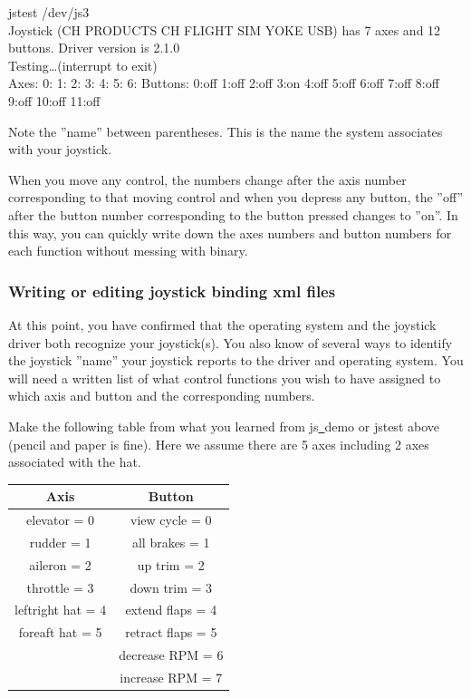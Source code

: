\begin{ttfamily}
\tiny
\noindent
jstest /dev/js3\\
Joystick (CH PRODUCTS CH FLIGHT SIM YOKE USB) has 7 axes and 12 buttons. Driver version is 2.1.0\\
Testing\ldots (interrupt to exit)\\
Axes:  0:   1:   2:  3:  4:  5:  6: Buttons:  0:off  1:off  2:off  3:on  4:off  5:off  6:off  7:off 8:off 9:off 10:off  11:off\\
\end{ttfamily}

\noindent
Note the ''name'' between parentheses.  This is the name the system associates with your joystick.

When you move any control, the numbers change after the axis number corresponding to that moving control and when you depress any button, the ''off'' after the button number corresponding to the button pressed changes to ''on''.  In this way, you can quickly write down the axes numbers and button numbers for each function without messing with binary.  

\subsubsection{Writing or editing joystick binding xml files\label{writing}}
At this point, you have confirmed that the operating system and the joystick driver both recognize your joystick(s).  You also know of several ways to identify the joystick ''name'' your joystick reports to the driver and operating system.  You will need a written list of what control functions you wish to have assigned to which axis and button and the corresponding numbers.  

 Make the following table from what you learned from js\underline{~}demo or jstest above (pencil and paper is fine).  Here we assume there are 5 axes including 2 axes associated with the hat.
\medskip

\begin{tabular}{c|c}
		Axis			      &           Button\\\hline
	elevator 	= 0	     &     	view cycle 	= 0\\
	rudder 		= 1	     &     	all brakes 	= 1\\
	aileron 	= 2	     &      	up trim 	= 2\\
	throttle 	= 3		   &       down trim 	= 3\\
	leftright hat 	= 4&	    	extend flaps	= 4\\
	foreaft hat 	= 5	&	      retract flaps	= 5\\
					          &        decrease RPM	= 6\\
					          &        increase RPM	= 7
\end{tabular}
\medskip


